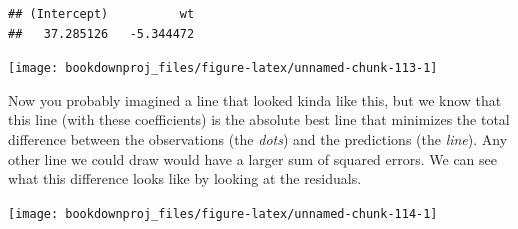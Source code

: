 \documentclass[
]{book}
\newenvironment{Shaded}{\begin{snugshade}}{\end{snugshade}}
\newcommand{\AttributeTok}[1]{\textcolor[rgb]{0.13,0.29,0.53}{#1}}
\newcommand{\DecValTok}[1]{\textcolor[rgb]{0.00,0.00,0.81}{#1}}
\newcommand{\FunctionTok}[1]{\textcolor[rgb]{0.13,0.29,0.53}{\textbf{#1}}}
\newcommand{\NormalTok}[1]{#1}
\newcommand{\SpecialCharTok}[1]{\textcolor[rgb]{0.81,0.36,0.00}{\textbf{#1}}}
\newcommand{\StringTok}[1]{\textcolor[rgb]{0.31,0.60,0.02}{#1}}
\begin{document}
\begin{verbatim}
## (Intercept)          wt 
##   37.285126   -5.344472
\end{verbatim}

\begin{Shaded}
\end{Shaded}

\begin{center}\texttt{[image: bookdownproj\_files/figure-latex/unnamed-chunk-113-1]} \end{center}

Now you probably imagined a line that looked kinda like this, but we know that this line (with these coefficients) is the absolute best line that minimizes the total difference between the observations (the \emph{dots}) and the predictions (the \emph{line}). Any other line we could draw would have a larger sum of squared errors. We can see what this difference looks like by looking at the residuals.

\begin{Shaded}
\end{Shaded}

\begin{center}\texttt{[image: bookdownproj\_files/figure-latex/unnamed-chunk-114-1]} \end{center}
\end{document}
